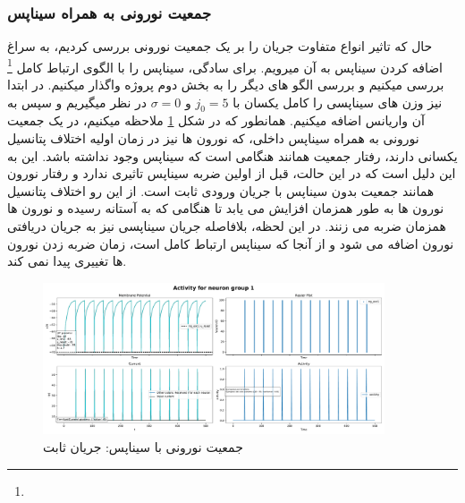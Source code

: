         \subsubsection*{جمعیت نورونی به همراه سیناپس}
        حال که تاثیر انواع متفاوت جریان را بر یک جمعیت نورونی بررسی کردیم، به سراغ اضافه کردن سیناپس به آن میرویم. برای سادگی، سیناپس را با الگوی ارتباط کامل
        \footnote{}
        بررسی میکنیم و بررسی الگو های دیگر را به بخش دوم پروژه واگذار میکنیم. در ابتدا نیز وزن های سیناپسی را کامل یکسان با
        $j_0=5$ و $\sigma=0$
        در نظر میگیریم و سپس به آن واریانس اضافه میکنیم. همانطور که در شکل
        \ref{fig:part1-simple-ng-with-synapse}
        ملاحظه میکنیم، در یک جمعیت نورونی به همراه سیناپس داخلی، که نورون ها نیز در زمان اولیه اختلاف پتانسیل یکسانی دارند، رفتار جمعیت همانند هنگامی است که سیناپس وجود نداشته باشد. این به این دلیل است که در این حالت، قبل از اولین ضربه سیناپس تاثیری ندارد و رفتار نورون  همانند جمعیت بدون سیناپس با جریان ورودی ثابت است. از این رو اختلاف پتانسیل نورون ها به طور همزمان افزایش می یابد تا هنگامی که به  آستانه رسیده و نورون ها همزمان ضربه می زنند. در این لحظه، بلافاصله جریان سیناپسی نیز به جریان دریافتی نورون اضافه می شود و از آنجا که سیناپس ارتباط کامل است، زمان ضربه زدن نورون ها تغییری پیدا نمی کند.
        \begin{figure}[!ht]
            \centering
            \includegraphics[width=0.9\textwidth]{plots/part1-Simple-ng-with-synapse.pdf} 
            \caption{جمعیت نورونی با سیناپس: جریان ثابت}
            \label{fig:part1-simple-ng-with-synapse}
        \end{figure}

